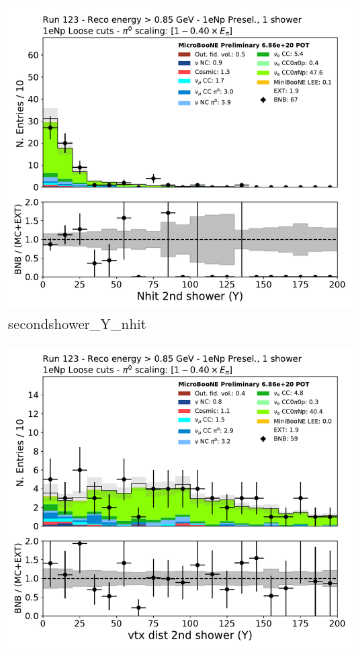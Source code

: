 \begin{figure}[H]
    \centering
    \begin{subfigure}{0.3\textwidth}
    \includegraphics[width=1.0\textwidth]{Sidebands/Figures/1eNp/HighEnergy/HiEext_NPOneShr_NPL_pi0e040/secondshower_Y_nhit.pdf}
    \caption{secondshower\_Y\_nhit}
    \end{subfigure}
    \begin{subfigure}{0.3\textwidth}
    \includegraphics[width=1.0\textwidth]{Sidebands/Figures/1eNp/HighEnergy/HiEext_NPOneShr_NPL_pi0e040/secondshower_Y_vtxdist.pdf}

\end{subfigure}
\end{figure}
